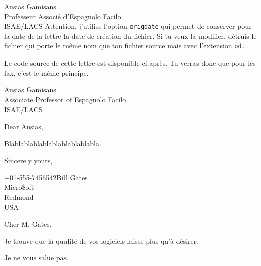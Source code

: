 \documentclass[pdftex,a4paper,12pt,origdate,fr]{supaero-lettre}
\begin{document}
\begin{letter}{Ausias Gamisans\\ Professeur Associé d'Espagnolo
    Facilo\\ISAE/LACS}
Attention, j'utilise l'option \texttt{origdate} qui permet de
conserver pour la date de la lettre la date de création du fichier. Si
tu veux la modifier, détruis le fichier qui porte le même nom que ton
fichier source mais avec l'extension \texttt{odt}.

Le code source de cette lettre est disponible ci-après. Tu verras donc
que pour les fax, c'est le même principe.



\end{letter}

\begin{letter}{Ausias Gamisans\\ Associate Professor of Espagnolo Facilo\\ISAE/LACS}

\anglais

\signature{Christophe Garion}



\opening{Dear Ausias,}

Blablablablablablablablablabla.

\closing{Sincerely yours,}

\end{letter}

\begin{telefax}{+01-555-7456542}{Bill Gates\\Micro\$oft\\Redmond\\USA}


\opening{Cher M. Gates,}

Je trouve que la qualité de vos logiciels laisse plus qu'à désirer.

\closing{Je ne vous salue pas.}

\end{telefax}
\end{document}
